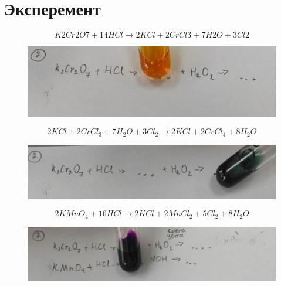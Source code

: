\section{Эксперемент}
\begin{equation} 
    K2Cr2O7 + 14HCl \xrightarrow{}  2KCl + 2CrCl3 + 7H2O + 3Cl2
\end{equation} 
\begin{figure}[h]
    \centering
    \includegraphics[width=1\linewidth]{Ex_3/Ex_3_1_1.jpg}
     \caption{}
    \label{ex_2_1}
\end{figure}
\begin{equation} 
    2KCl + 2CrCl_3 + 7H_2O + 3Cl_2 
    \xrightarrow{} 2KCl + 2CrCl_ 4 + 8H_2O 
\end{equation} 
\begin{figure}[h]
    \centering
    \includegraphics[width=1\linewidth]{Ex_3/Ex_3_1_2.jpg}
     \caption{}
    \label{ex_2_1}
\end{figure}


\begin{equation} 
    2KMnO_4 + 16HCl \xrightarrow{} 
    2KCl + 2MnCl_2 + 5Cl_2 + 8H_2O
\end{equation} 
\begin{figure}[h]
    \centering
    \includegraphics[width=1\linewidth]{Ex_3/Ex_3_2_1.jpg}
     \caption{}
    \label{ex_2_1}
\end{figure}

